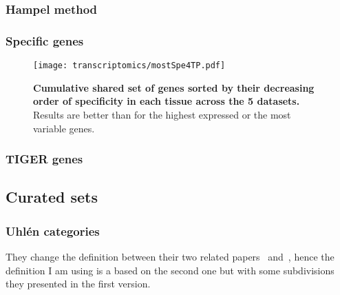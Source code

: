 \subsubsection{Hampel method}

\subsubsection{Specific genes}

\begin{figure}[htpb]
    \texttt{[image: transcriptomics/mostSpe4TP.pdf]}\centering
    \caption[Cumulative shared set of genes sorted by their specificity in each
    tissue across the 5 datasets]{\label{fig:mostSpe4T}\textbf{Cumulative shared
    set of genes sorted by their decreasing order of specificity in each tissue
    across the 5 datasets.} Results are better than for the highest expressed or
    the most variable genes.}
\end{figure}

\subsubsection{TIGER genes}




\subsection{Curated sets}\label{subsec:Trans_curatedSets}


\subsubsection{Uhlén categories}

They change the definition between their two related papers~
and~, hence the definition I am using is a based on the second
one but with some subdivisions they presented in the first version.

